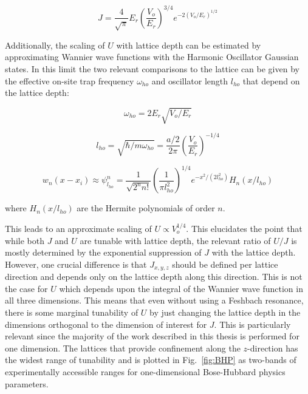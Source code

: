 \begin{equation}
\label{eqn:tightJ}
J = \frac{4}{\sqrt{\pi}} E_r \left ( \frac{V_o}{E_r} \right )^{3/4} e^{-2 (V_o/E_r)^{1/2}}
\end{equation}

 Additionally, the scaling of $U$ with lattice depth can be estimated by approximating Wannier wave functions with the Harmonic Oscillator Gaussian states. In this limit the two relevant comparisons to the lattice can be given by the effective on-site trap frequency $\omega_{ho}$ and oscillator length $l_{ho}$ that depend on the lattice depth:
 
\begin{equation}
\label{eqn:w_ho}
\omega_{ho} = 2 E_r \sqrt{V_o/ E_r}
\end{equation}

\begin{equation}
\label{eqn:l_ho}
l_{ho}=\sqrt{\hbar / m \omega_{ho}} = \frac{a/2}{2\pi} \left ( \frac{V_o}{E_r} \right )^{-1/4}
\end{equation}

\begin{equation}
\label{eqn:wnHO}
w_n(x-x_i) \approx \psi_{l_{ho}}^n = \frac{1}{\sqrt{2^n n!}} \left ( \frac{1}{\pi l_{ho}^2} \right )^{1/4} e^{-x^2/(2 l_{ho}^2)} H_n (x / l_{ho})
\end{equation}

where $H_n(x/l_{ho})$ are the Hermite polynomials of order $n$.

This leads to an approximate scaling of $U\propto V_o^{1/4}$. This elucidates the point that while both $J$ and $U$ are tunable with lattice depth, the relevant ratio of $U/J$ is mostly determined by the exponential suppression of $J$ with the lattice depth. However, one crucial difference is that $J_{x,y,z}$ should be defined per lattice direction and depends only on the lattice depth along this direction. This is not the case for $U$ which depends upon the integral of the Wannier wave function in all three dimensions. This means that even without using a Feshbach resonance, there is some marginal tunability of $U$ by just changing the lattice depth in the dimensions orthogonal to the dimension of interest for $J$. This is particularly relevant since the majority of the work described in this thesis is performed for one dimension. The lattices that provide confinement along the $z$-direction has the widest range of tunability and is plotted in Fig.~\ref{fig:BHP} as two-bands of experimentally accessible ranges for one-dimensional Bose-Hubbard physics parameters.

